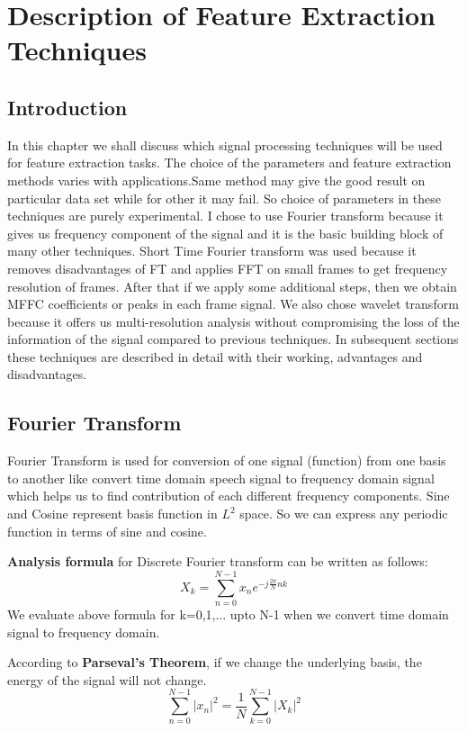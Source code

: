 \documentclass[11pt]{report}
\begin{document}
\chapter{Description of Feature Extraction Techniques} 
\section{Introduction}
In this chapter we shall discuss which signal processing techniques will be used for feature extraction tasks. The choice of the parameters and feature extraction methods varies with applications.Same method may give the good result on particular data set while for other it may fail.   So choice of parameters in these techniques are purely experimental. I chose to use Fourier transform because it gives us frequency component of the signal and it is the basic building block of many other techniques. Short Time Fourier transform was used because it removes disadvantages of FT and applies FFT on small frames to get frequency resolution of frames. After that if we apply some additional steps, then we obtain MFFC coefficients or peaks in each frame signal. We also chose wavelet transform because it offers us multi-resolution analysis without compromising  the loss of the information  of the signal compared to previous techniques. In subsequent sections these techniques are described in detail with their working, advantages and disadvantages.

\section{Fourier Transform}
Fourier Transform is used for conversion of one signal (function) from one basis to another like convert time domain speech signal to frequency domain signal which helps us to find contribution of each different frequency components. Sine and Cosine represent basis function in $L^2$ space. So we can express any periodic function in terms of sine and cosine. 

\textbf{Analysis formula} for Discrete Fourier transform can be written as follows:
\begin{equation}
X_{k}=\sum\limits_{n=0}^{N-1} x_{n} e^ {-j\frac{2\pi}{N}nk} 
\end{equation}
We evaluate above formula for k=0,1,... upto N-1 when we convert time domain signal to frequency domain.

According to \textbf{Parseval's Theorem}, if we change the underlying basis, the energy of the signal will not change.
\begin{equation}
\sum\limits_{n=0}^{N-1} {|x_{n}|}^2 =\frac{1}{N}\sum\limits_{k=0}^{N-1} {|X_{k}|}^2
\end{equation}
\end{document}
